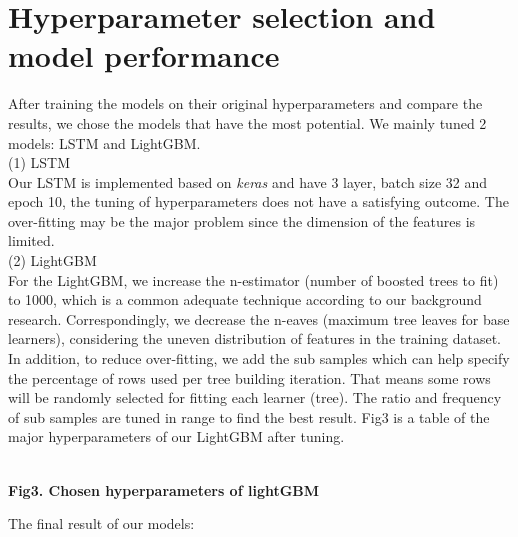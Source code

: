 \documentclass{article}
\begin{document}
\section{Hyperparameter selection and model performance}
After training the models on their original hyperparameters and compare the results, we chose the models that have the most potential. We mainly tuned 2 models: LSTM and LightGBM.\\
(1) LSTM\\
Our LSTM is implemented based on \textit{keras} and  have 3 layer, batch size 32 and epoch 10, the tuning of hyperparameters does not have a satisfying outcome. The over-fitting may be the major problem since the dimension of the features is limited.\\
(2) LightGBM\\
For the LightGBM, we increase the n-estimator (number of boosted trees to fit) to 1000, which is a common adequate technique according to our background research. Correspondingly, we decrease the n-eaves (maximum tree leaves for base learners), considering the uneven distribution of features in the training dataset. In addition, to reduce over-fitting, we add the sub samples which can help specify the percentage of rows used per tree building iteration. That means some rows will be randomly selected for fitting each learner (tree). The ratio and frequency of sub samples are tuned in range to find the best result.  Fig3 is a table of the major hyperparameters of our LightGBM after tuning.\\
\begin{center} 
\centering
{}\\
\textbf{Fig3. Chosen hyperparameters of lightGBM}\\
\end{center}

The final result of our models:
\end{document}
